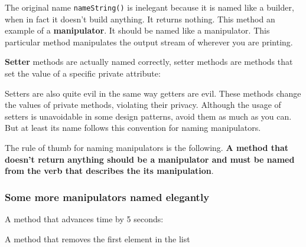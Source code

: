 The original name \texttt{nameString()} is inelegant because it is named
like a builder, when in fact it doesn't build anything. It returns
nothing. This method an example of a \textbf{manipulator}. It should be
named like a manipulator. This particular method manipulates the output
stream of wherever you are printing.

\textbf{Setter} methods are actually named correctly, setter methods are
methods that set the value of a specific private attribute:

\begin{Shaded}
\begin{Highlighting}[]
\NormalTok{):}
    \OperatorTok{=}
\end{Highlighting}
\end{Shaded}

Setters are also quite evil in the same way getters are evil. These
methods change the values of private methods, violating their privacy.
Although the usage of setters is unavoidable in some design patterns,
avoid them as much as you can. But at least its name follows this
convention for naming manipulators.

The rule of thumb for naming manipulators is the following. \textbf{A
method that doesn't return anything should be a manipulator and must be
named from the verb that describes the its manipulation}.

\subsubsection{Some more manipulators named
elegantly}\label{extra-stuff.md__some-more-manipulators-named-elegantly}

A method that advances time by 5 seconds:

\begin{Shaded}
\begin{Highlighting}[]
\NormalTok{):}
    \OperatorTok{=} \OperatorTok{+} 
\end{Highlighting}
\end{Shaded}

A method that removes the first element in the list

